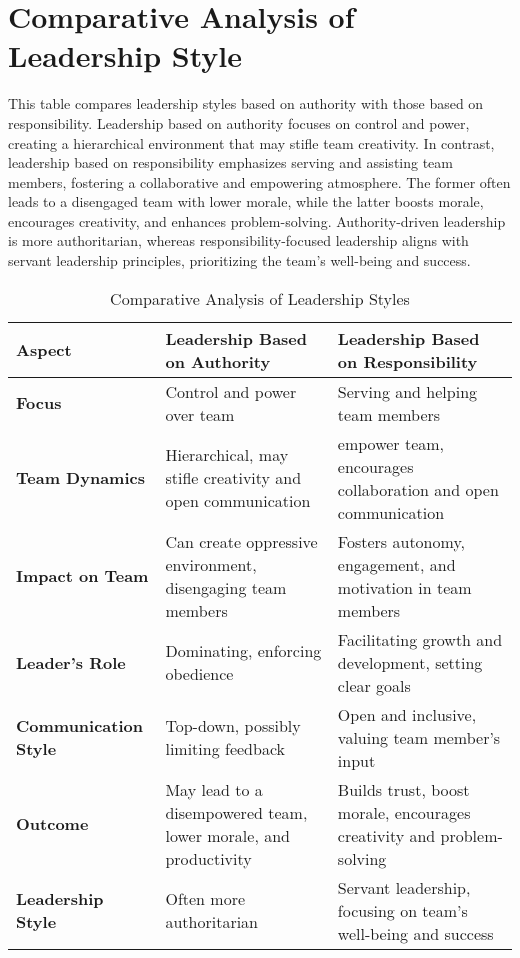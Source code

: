 \documentclass[runningheads]{llncs}
\begin{document}
\section{Comparative Analysis of Leadership Style}

This table compares leadership styles based on authority with those based on responsibility. Leadership based on authority focuses on control and power, creating a hierarchical environment that may stifle team creativity. In contrast, leadership based on responsibility emphasizes serving and assisting team members, fostering a collaborative and empowering atmosphere. The former often leads to a disengaged team with lower morale, while the latter boosts morale, encourages creativity, and enhances problem-solving. Authority-driven leadership is more authoritarian, whereas responsibility-focused leadership aligns with servant leadership principles, prioritizing the team's well-being and success.
\begin{table}[h]
\centering
\caption{Comparative Analysis of Leadership Styles}
\begin{tabularx}{\textwidth}{|@{\hspace{2mm}}X|@{\hspace{2mm}}X@{\hspace{2mm}}|@{\hspace{2mm}}X@{\hspace{2mm}}|}
\hline
\textbf{Aspect} & \textbf{Leadership Based on Authority} & \textbf{Leadership Based on Responsibility} \\ \hline
\textbf{Focus} & Control and power over team & Serving and helping team members \\ \hline
\textbf{Team Dynamics} & Hierarchical, may stifle creativity and open communication & empower team, encourages collaboration and open communication \\ \hline
\textbf{Impact on Team} & Can create oppressive environment, disengaging team members & Fosters autonomy, engagement, and motivation in team members \\ \hline
\textbf{Leader's Role} & Dominating, enforcing obedience & Facilitating growth and development, setting clear goals \\ \hline
\textbf{Communication Style} & Top-down, possibly limiting feedback & Open and inclusive, valuing team member’s input \\ \hline
\textbf{Outcome} & May lead to a disempowered team, lower morale, and productivity & Builds trust, boost morale, encourages creativity and problem-solving \\ \hline
\textbf{Leadership Style} & Often more authoritarian & Servant leadership, focusing on team's well-being and success \\ \hline
\end{tabularx}
\end{table}
\end{document}
